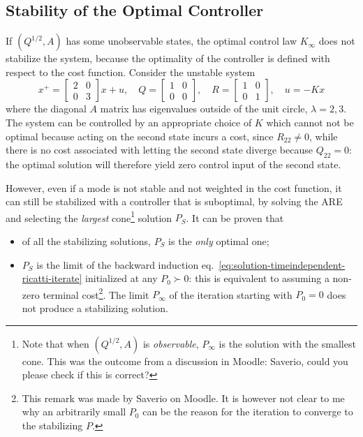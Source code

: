 \subsection{Stability of the Optimal Controller}
\label{sec:stability-optimal-controller}

If $(Q^{1/2},A)$ has some unobservable states, the optimal control law $K_\infty$ does not stabilize the system, because the optimality of the controller is defined with respect to the cost function. Consider the unstable system
\begin{equation*}
  x^+ =
  \begin{bmatrix}
    2 & 0 \\ 0 & 3
  \end{bmatrix}x + u, \quad Q =
  \begin{bmatrix}
    1 & 0 \\ 0 & 0
  \end{bmatrix}, \quad R =
  \begin{bmatrix}
    1 & 0 \\ 0 & 1
  \end{bmatrix},\quad u =-Kx
\end{equation*}
where the diagonal $A$ matrix has eigenvalues outside of the unit circle, $\lambda=2,3$. The system can be controlled by an appropriate choice of $K$ which cannot not be optimal because acting on the second state incurs a cost, since $R_{22}\neq 0$, while there is no cost associated with letting the second state diverge because $Q_{22}=0$: the optimal solution will therefore yield zero control input of the second state.

However, even if a mode is not stable and not weighted in the cost function, it can still be stabilized with a controller that is suboptimal, by solving the ARE and selecting the \emph{largest} cone\footnote{Note that when $(Q^{1/2},A)$ is \emph{observable}, $P_\infty$ is the solution with the smallest cone. This was the outcome from a discussion in Moodle: Saverio, could you please check if this is correct?} solution $P_S$. It can be proven that
\begin{itemize}
\item of all the stabilizing solutions, $P_S$ is the \emph{only} optimal one;
\item $P_S$ is the limit of the backward induction eq.~\eqref{eq:solution-timeindependent-ricatti-iterate} initialized at any $P_0\succ 0$: this is equivalent to assuming a non-zero terminal cost\footnote{This remark was made by Saverio on Moodle. It is however not clear to me why an arbitrarily small $P_0$ can be the reason for the iteration to converge to the stabilizing $P$.}. The limit $P_\infty$ of the iteration starting with $P_0=0$ does not produce a stabilizing solution.
\end{itemize}

